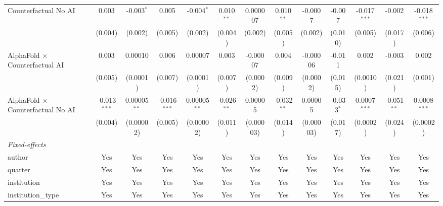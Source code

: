 \begin{tabular}{lcccccccccccc}
   Counterfactual No AI                     & 0.003          & -0.003$^{*}$   & 0.005          & -0.004$^{*}$   & 0.010$^{**}$  & 0.000007      & 0.010$^{**}$  & -0.0007       & -0.007        & -0.017$^{***}$ & -0.002        & -0.018$^{***}$\\   
                                            & (0.004)        & (0.002)        & (0.005)        & (0.002)        & (0.004)       & (0.002)       & (0.005)       & (0.002)       & (0.010)       & (0.005)        & (0.017)       & (0.006)\\   
   AlphaFold $\times$ Counterfactual AI     & 0.003          & 0.00010        & 0.006          & 0.00007        & 0.003         & -0.00007      & 0.004         & -0.00006      & -0.011        & 0.002          & -0.003        & 0.002\\   
                                            & (0.005)        & (0.0001)       & (0.007)        & (0.0001)       & (0.007)       & (0.0002)      & (0.009)       & (0.0002)      & (0.015)       & (0.0010)       & (0.021)       & (0.001)\\   
   AlphaFold $\times$ Counterfactual No AI  & -0.013$^{***}$ & 0.00005$^{**}$ & -0.016$^{***}$ & 0.00005$^{**}$ & -0.026$^{**}$ & 0.00005       & -0.032$^{**}$ & 0.00005       & -0.033$^{*}$  & 0.0007$^{***}$ & -0.051$^{**}$ & 0.0008$^{***}$\\   
                                            & (0.004)        & (0.00002)      & (0.005)        & (0.00002)      & (0.011)       & (0.00003)     & (0.014)       & (0.00003)     & (0.017)       & (0.0002)       & (0.024)       & (0.0002)\\   
   \midrule
   \emph{Fixed-effects}\\
   author                                   & Yes            & Yes            & Yes            & Yes            & Yes           & Yes           & Yes           & Yes           & Yes           & Yes            & Yes           & Yes\\  
   quarter                                  & Yes            & Yes            & Yes            & Yes            & Yes           & Yes           & Yes           & Yes           & Yes           & Yes            & Yes           & Yes\\  
   institution                              & Yes            & Yes            & Yes            & Yes            & Yes           & Yes           & Yes           & Yes           & Yes           & Yes            & Yes           & Yes\\  
   institution\_type                        & Yes            & Yes            & Yes            & Yes            & Yes           & Yes           & Yes           & Yes           & Yes           & Yes            & Yes           & Yes\\  

\end{tabular}
